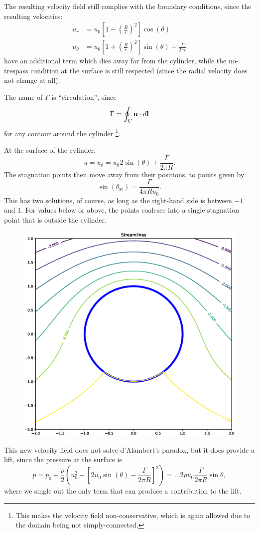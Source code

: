 The resulting velocity field still complies with the boundary
conditions, since the resulting velocities:
\begin{align}
u_r     &=   u_0  \left[ 1 - \left( \frac{R}{r}\right)^2 \right] \cos(\theta) \\
u_\theta &=   u_0  \left[ 1 + \left( \frac{R}{r}\right)^2 \right] \sin(\theta) +\frac{\Gamma}{2\pi r} 
\end{align}
have an additional term which dies away far from the cylinder, while
the no-trespass condition at the surface is still respected (since the
radial velocity does not change at all).

The name of $\Gamma$ is ``circulation'', since
\[
\Gamma = \oint_C \mathbf{u}\cdot d\mathbf{l}
\]
for any contour around the cylinder \footnote{This makes the velocity
  field non-conservative, which is again allowed due to the domain
  being not simply-connected.}.

At the surface of the cylinder,
\[
u= u_\theta =   u_0  2 \sin(\theta) +\frac{\Gamma}{2\pi R} .
\]
The stagnation points then move away from their positions, to points given by
\[
\sin(\theta_\mathrm{st})  = \frac{\Gamma}{4\pi R u_0} .
\]
This has two solutions, of course, as long as the right-hand side is
between $-1$ and $1$. For values below or above, the points coalesce
into a single stagnation point that is outside the cylinder.

\begin{figure}
  \centering
  \includegraphics[width=0.4\linewidth]{figures/potential_flow_past_cylinder_rotating}
  \caption{\label{fig:}}
\end{figure}


This new velocity field does not solve d'Alambert's paradox, but it
does provide a lift, since the pressure at the surface is
\[
p= p_0 + \frac{\rho}2   \left(u_0^2 -  \left[ 2  u_0 \sin(\theta) - \frac{\Gamma}{2\pi R} \right]^2 \right) =
\ldots  2 \rho u_0   \frac{\Gamma}{2\pi R} \sin\theta ,
\]
where we single out the only term that can produce a contribution to the lift.


